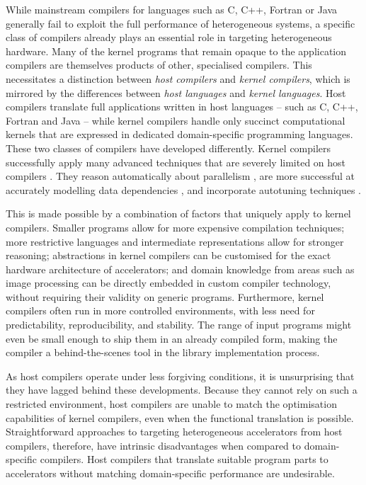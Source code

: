    While mainstream compilers for languages such as C, C++, Fortran or Java
    generally fail to exploit the full performance of heterogeneous systems, a
    specific class of compilers already plays an essential role in
    targeting heterogeneous hardware.
    Many of the kernel programs that remain opaque to the application compilers
    are themselves products of other, specialised compilers.
    This necessitates a distinction between {\em host compilers} and {\em kernel
    compilers}, which is mirrored by the differences between
    {\em host languages} and {\em kernel languages}.
    Host compilers translate full applications written in host languages -- such
    as C, C++, Fortran and Java -- while kernel compilers handle only succinct
    computational kernels that are expressed in dedicated domain-specific
    programming languages.
    These two classes of compilers have developed differently.
    Kernel compilers successfully apply many advanced techniques that are
    severely limited on host compilers
    \citep{Murphy2014LimitsOD,Maleki:2011:EVC:2120965.2121464}.
    They reason automatically about parallelism
    \citep{Steuwer:2017:LFD:3049832.3049841}, are more successful at accurately
    modelling data dependencies \cite{Ragan-Kelley2013Halide}, and incorporate
    autotuning techniques \citep{Ansel:2014:OEF:2628071.2628092}.

    This is made possible by a combination of factors that uniquely apply to
    kernel compilers.
    Smaller programs allow for more expensive compilation techniques;
    more restrictive languages and intermediate representations allow for
    stronger reasoning;
    abstractions in kernel compilers can be customised for the exact hardware
    architecture of accelerators;
    and domain knowledge from areas such as image processing can be directly
    embedded in custom compiler technology, without requiring their validity
    on generic programs.
    Furthermore, kernel compilers often run in more controlled environments,
    with less need for predictability, reproducibility, and stability.
    The range of input programs might even be small enough to ship them in an
    already compiled form, making the compiler a behind-the-scenes tool in the
    library implementation process.

    As host compilers operate under less forgiving conditions, it is
    unsurprising that they have lagged behind these developments.
    Because they cannot rely on such a restricted environment, host compilers
    are unable to match the optimisation capabilities of kernel compilers, even
    when the functional translation is possible.
    Straightforward approaches to targeting heterogeneous accelerators from host
    compilers, therefore, have intrinsic disadvantages when compared to
    domain-specific compilers.
    Host compilers that translate suitable program parts to accelerators without
    matching domain-specific performance are undesirable.

